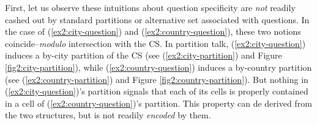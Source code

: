 \begin{exe}
	\ex 
	\begin{xlist}
		\label{ex2:city-question}
		\label{ex2:country-question}
	\end{xlist}
\end{exe}

First, let us observe these intuitions about question specificity are \textit{not} readily cashed out by standard partitions or alternative set associated with questions. In the case of (\ref{ex2:city-question}) and (\ref{ex2:country-question}), these two notions coincide--\textit{modulo} intersection with the CS. In partition talk, (\ref{ex2:city-question}) induces a by-city partition of the CS (see (\ref{ex2:city-partition}) and Figure \ref{fig2:city-partition}), while (\ref{ex2:country-question}) induces a by-country partition (see (\ref{ex2:country-partition}) and Figure \ref{fig2:country-partition}). But nothing in (\ref{ex2:city-question})'s partition signals that each of its cells is properly contained in a cell of (\ref{ex2:country-question})'s partition. This property can de derived from the two structures, but is not readily \textit{encoded} by them.

\begin{exe}
	\ex 
	\begin{xlist}
		\label{ex2:city-partition}
		\label{ex2:country-partition}
	\end{xlist}
\end{exe}

